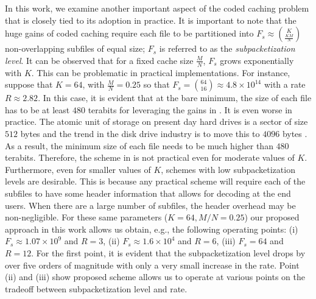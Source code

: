 \documentclass[journal,twocolumn]{IEEEtran}
\theoremstyle{definition}
\newcommand{\aditya}[1]{\marginpar{+}{\bf Aditya's remark}: {\em #1}}
\newcommand{\litang}[1]{\marginpar{+}{\bf Li's remark}: {\em #1}}
\begin{document}
In this work, we examine another important aspect of the coded caching problem that is closely tied to its adoption in practice. It is important to note that the huge gains of coded caching require each file to be partitioned into $F_s \approx \binom{K}{\frac{KM}{N}}$ non-overlapping subfiles of equal size; $F_s$ is referred to as the \emph{subpacketization level}. It can be observed that for a fixed cache size $\frac{M}{N}$, $F_s$ grows exponentially with $K$. This can be problematic in practical implementations. For instance, suppose that $K=64$, with $\frac{M}{N}=0.25$ so that $F_s=\binom{64}{16}\approx 4.8 \times 10^{14}$ with a rate $R \approx 2.82$. In this case, it is evident that at the bare minimum, the size of each file has to be at least $480$ terabits for leveraging the gains in \cite{maddahN14}. It is even worse in practice. The atomic unit of storage on present day hard drives is a sector of size $512$ bytes and the trend in the disk drive industry is to move this to $4096$ bytes \cite{toshiba_wp}. As a result, the minimum size of each file needs to be much higher than $480$ terabits. Therefore, the scheme in \cite{maddahN14} is not practical even for moderate values of $K$. Furthermore, even for smaller values of $K$, schemes with low subpacketization levels are desirable. This is because any practical scheme will require each of the subfiles to have some header information that allows for decoding at the end users. When there are a large number of subfiles, the header overhead may be non-negligible. For these same parameters ($K=64, M/N = 0.25$) our proposed approach in this work allows us obtain, e.g., the following operating points: (i) $F_s \approx 1.07 \times 10^9$ and $R = 3$, (ii) $F_s \approx 1.6\times 10^4$ and $R=6$, (iii) $F_s=64$ and $R=12$. For the first point, it is evident that the subpacketization level drops by over five orders of magnitude with only a very small increase in the rate. Point (ii) and (iii) show proposed scheme allows us to operate at various points on the tradeoff between subpacketization level and rate. %

\end{document}
